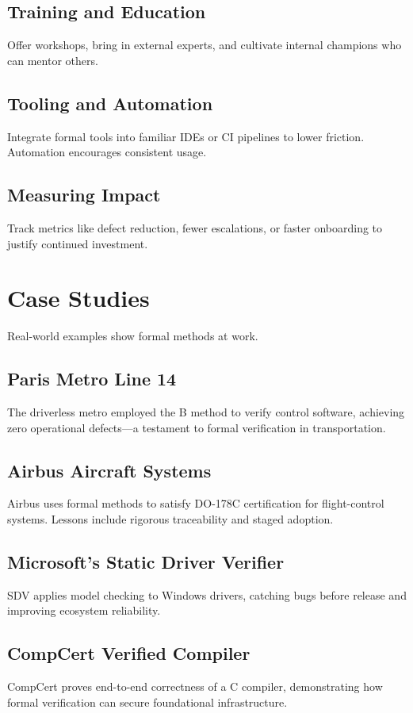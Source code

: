 \subsection{Training and Education}
Offer workshops, bring in external experts, and cultivate internal champions who can mentor others.

\subsection{Tooling and Automation}
Integrate formal tools into familiar IDEs or CI pipelines to lower friction. Automation encourages consistent usage.

\subsection{Measuring Impact}
Track metrics like defect reduction, fewer escalations, or faster onboarding to justify continued investment.

\section{Case Studies}
\label{sec:formal-cases}

Real-world examples show formal methods at work.

\subsection{Paris Metro Line 14}
The driverless metro employed the B method to verify control software, achieving zero operational defects—a testament to formal verification in transportation.

\subsection{Airbus Aircraft Systems}
Airbus uses formal methods to satisfy DO-178C certification for flight-control systems. Lessons include rigorous traceability and staged adoption.

\subsection{Microsoft's Static Driver Verifier}
SDV applies model checking to Windows drivers, catching bugs before release and improving ecosystem reliability.

\subsection{CompCert Verified Compiler}
CompCert proves end-to-end correctness of a C compiler, demonstrating how formal verification can secure foundational infrastructure.

